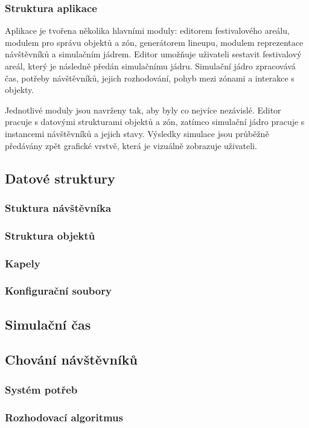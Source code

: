 \documentclass[
  program=itp,
  biblatex,
  figures=false,
  glossaries,
  index
]{kidiplom}
\begin{document}
\subsubsection{Struktura aplikace}
Aplikace je tvořena několika hlavními moduly: editorem festivalového areálu, modulem pro správu objektů a zón, generátorem lineupu, modulem reprezentace návštěvníků a simulačním jádrem. Editor umožňuje uživateli sestavit festivalový areál, který je následně předán simulačnímu jádru. Simulační jádro zpracovává čas, potřeby návštěvníků, jejich rozhodování, pohyb mezi zónami a interakce s objekty.

Jednotlivé moduly jsou navrženy tak, aby byly co nejvíce nezávislé. Editor pracuje s datovými strukturami objektů a zón, zatímco simulační jádro pracuje s instancemi návštěvníků a jejich stavy. Výsledky simulace jsou průběžně předávány zpět grafické vrstvě, která je vizuálně zobrazuje uživateli.

\subsection{Datové struktury}
\subsubsection{Stuktura návštěvníka}
\subsubsection{Struktura objektů}
\subsubsection{Kapely}
\subsubsection{Konfigurační soubory}
\subsection{Simulační čas}
\subsection{Chování návštěvníků}
\subsubsection{Systém potřeb}
\subsubsection{Rozhodovací algoritmus}
\end{document}
